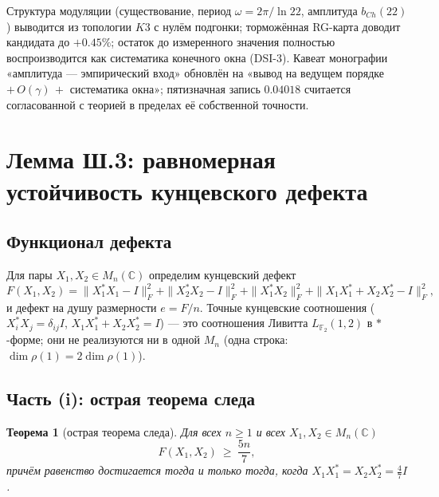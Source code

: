 \documentclass[11pt,a4paper]{article}
\theoremstyle{plain}
\newtheorem{theorem}{Теорема}[section]
\theoremstyle{definition}
\theoremstyle{remark}
\begin{document}
\begin{honestybox}
Структура модуляции (существование, период $\omega=2\pi/\ln22$, амплитуда
$b_{Ch}(22)$) выводится из топологии $K3$ с нулём подгонки; торможённая
RG-карта доводит кандидата до $+0.45\%$; остаток до измеренного значения
полностью воспроизводится как систематика конечного окна (DSI-3). Кавеат
монографии «амплитуда --- эмпирический вход» обновлён на «вывод на ведущем
порядке $+\,O(\gamma)\,+$ систематика окна»; пятизначная запись $0.04018$
считается согласованной с теорией в пределах её собственной точности.
\end{honestybox}

\section{Лемма Ш.3: равномерная устойчивость кунцевского дефекта}\label{sec:lemma}

\subsection{Функционал дефекта}

Для пары $X_1,X_2\in M_n(\mathbb C)$ определим кунцевский дефект
\begin{equation}
  F(X_1,X_2)=\|X_1^*X_1-I\|_F^2+\|X_2^*X_2-I\|_F^2+\|X_1^*X_2\|_F^2
  +\|X_1X_1^*+X_2X_2^*-I\|_F^2,
\label{eq:defect}
\end{equation}
и дефект на душу размерности $e=F/n$. Точные кунцевские соотношения
($X_i^*X_j=\delta_{ij}I$, $X_1X_1^*+X_2X_2^*=I$) --- это соотношения Ливитта
$L_{\mathbb F_2}(1,2)$ в $\ast$-форме; они не реализуются ни в одной $M_n$
(одна строка: $\dim\rho(1)=2\dim\rho(1)$).

\subsection{Часть (i): острая теорема следа}

\begin{theorem}[острая теорема следа]\label{th:trace}
Для всех $n\ge1$ и всех $X_1,X_2\in M_n(\mathbb C)$
\begin{equation}
  F(X_1,X_2)\ \ge\ \frac{5n}{7},
\end{equation}
причём равенство достигается тогда и только тогда, когда
$X_1X_1^*=X_2X_2^*=\tfrac47 I$.
\end{theorem}
\end{document}
